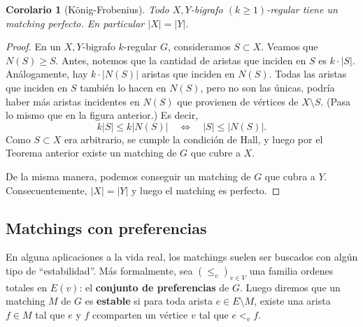 \documentclass[12pt]{report}
\theoremstyle{plain}
\newtheorem{corollary}[theorem]{Corolario}
\theoremstyle{definition}
\newcommand{\abs}[1]{\left \vert #1 \right \vert}
\begin{document}
\begin{corollary}[König-Frobenius]\label{corollary:König-Frobenius - todo bigrafo regular no trivial tiene un matching perfecto}
Todo $X,Y$-bigrafo $(k \geq 1)$-regular tiene un matching perfecto. En particular $\abs X = \abs Y$.
\end{corollary}
\begin{proof}
En un $X,Y$-bigrafo $k$-regular $G$, consideramos $S \subset X$. Veamos que $N(S) \geq S$. Antes, notemos que
la cantidad de aristas que inciden en $S$ es $k \cdot \abs S$. Análogamente, hay $k \cdot \abs{N(S)}$
aristas que inciden en $N(S)$. Todas las aristas que inciden en $S$ también lo hacen en $N(S)$, pero no son
las únicas, podría haber más aristas incidentes en $N(S)$ que provienen de vértices de $X \setminus S$. (Pasa lo
mismo que en la figura anterior.) Es
decir,
 \[
     k \abs S \leq k \abs{N(S)} \quad \Leftrightarrow \quad \abs S \leq \abs{N(S)}.
 \]
Como $S\subset X$ era arbitrario, se cumple la condición de Hall, y luego por el Teorema anterior existe un
matching de $G$ que cubre a $X$.

De la misma manera, podemos conseguir un matching de $G$ que cubra a $Y$. Consecuentemente, $\abs X = \abs Y$
y luego el matching es perfecto.
\end{proof}


\subsection{Matchings con preferencias}

En alguna aplicaciones a la vida real, los matchings suelen ser buscados con algún tipo de ``estabilidad''. Más formalmente, sea $(\leq_v)_{v \in V}$ una familia ordenes totales en $E(v)$: el \textbf{conjunto de preferencias} de $G$. Luego diremos que un matching $M$ de $G$ es \textbf{estable} si para toda arista $e \in E \setminus M$, existe una arista $f \in M$ tal que $e$ y $f$ ccomparten un vértice $v$ tal que $e <_v f$.
\end{document}
